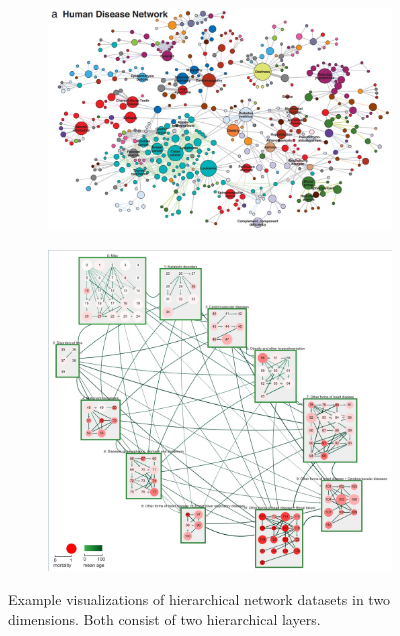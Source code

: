 \begin{figure}[h]
    \centering
    \begin{subfigure}[b]{0.4\columnwidth}
        \centering
        \includegraphics[width=\textwidth, trim={0 0 9cm 0},clip]{graphics/Human_Disease_Network.jpg}
        \label{fig:Human_Disease_Network}
    \end{subfigure}\hfill
    \begin{subfigure}[b]{0.5\columnwidth}
      \centering
      \includegraphics[width=\textwidth]{graphics/original2DdiseaseNet.jpg}
      \label{fig:original2DdiseaseNet}
    \end{subfigure}
    \caption[Visualizations of hierarchical network datasets.]{Example visualizations of hierarchical network datasets in two dimensions. Both consist of two hierarchical layers.} %
    \label{fig:intro} 
  \end{figure}

